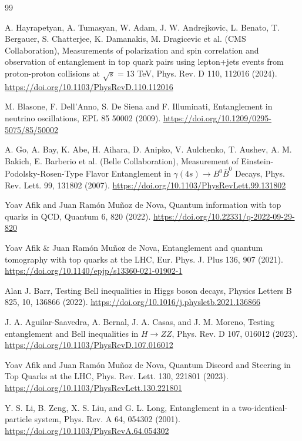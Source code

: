 \documentclass[12pt,a4paper]{article}
\begin{document}
\begin{thebibliography}{99}
	
	A. Hayrapetyan, A. Tumasyan, W. Adam, J. W. Andrejkovic, L. Benato, T. Bergauer, S. Chatterjee, K. Damanakis, M. Dragicevic et al. (CMS Collaboration),
	Measurements of polarization and spin correlation and observation of entanglement in top quark pairs using lepton+jets events from proton-proton collisions at $\sqrt{s} =13$ TeV,
	Phys. Rev. D 110, 112016 (2024).	
	\url{https://doi.org/10.1103/PhysRevD.110.112016}
	
	
	M. Blasone, F. Dell'Anno, S. De Siena and F. Illuminati,
	Entanglement in neutrino oscillations,
	EPL 85 50002 (2009).
	\url{https://doi.org/10.1209/0295-5075/85/50002}
	
	
	A. Go, A. Bay, K. Abe, H. Aihara, D. Anipko, V. Aulchenko, T. Aushev, A. M. Bakich, E. Barberio et al. (Belle Collaboration),
	Measurement of Einstein-Podolsky-Rosen-Type Flavor Entanglement in $\gamma (4s) \rightarrow B^0 \bar{B}^0$ Decays,
	Phys. Rev. Lett. 99, 131802 (2007).	
	\url{https://doi.org/10.1103/PhysRevLett.99.131802}
	
	
	Yoav Afik and Juan Ramón Muñoz de Nova,	
	Quantum information with top quarks in QCD,
	Quantum 6, 820 (2022).
	\url{https://doi.org/10.22331/q-2022-09-29-820}
	
	
	Yoav Afik \& Juan Ramón Muñoz de Nova,
	Entanglement and quantum tomography with top quarks at the LHC,
	Eur. Phys. J. Plus 136, 907 (2021).
	\url{https://doi.org/10.1140/epjp/s13360-021-01902-1}
	
	
	Alan J. Barr,
	Testing Bell inequalities in Higgs boson decays,
	Physics Letters B 825, 10, 136866 (2022).	
	\url{https://doi.org/10.1016/j.physletb.2021.136866}
	
	
	J. A. Aguilar-Saavedra, A. Bernal, J. A. Casas, and J. M. Moreno,
	Testing entanglement and Bell inequalities in $H \rightarrow ZZ$,
	Phys. Rev. D 107, 016012 (2023).
	\url{https://doi.org/10.1103/PhysRevD.107.016012}
	
	
	Yoav Afik and Juan Ramón Muñoz de Nova,
	Quantum Discord and Steering in Top Quarks at the LHC,
	Phys. Rev. Lett. 130, 221801 (2023).	
	\url{https://doi.org/10.1103/PhysRevLett.130.221801}
	
	
	Y. S. Li, B. Zeng, X. S. Liu, and G. L. Long,
	Entanglement in a two-identical-particle system,
	Phys. Rev. A 64, 054302 (2001).
	\url{https://doi.org/10.1103/PhysRevA.64.054302}
	

\end{thebibliography}
\end{document}
